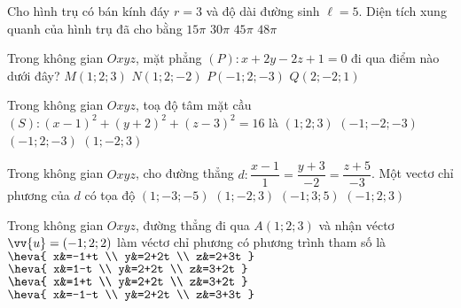 \begin{ex}%
	Cho hình trụ có bán kính đáy $r=3$ và độ dài đường sinh $\ell=5$. Diện tích xung quanh của hình trụ đã cho bằng
	\choice
	{$15\pi$}
	{\True $30\pi$}
	{$45\pi$}
	{$48\pi$}
\end{ex}	

\begin{ex}%
	Trong không gian $Oxyz$, mặt phẳng $(P)\colon x+2y-2z+1=0$ đi qua điểm nào dưới đây?
	\choice
	{\True $M(1;2;3)$}
	{$N(1;2;-2)$}
	{$P(-1;2;-3)$}
	{$Q(2;-2;1)$}
\end{ex}	

\begin{ex}%
	Trong không gian $Oxyz$, toạ độ tâm mặt cầu $(S)\colon (x-1)^2+(y+2)^2+(z-3)^2=16$ là
	\choice
	{$(1;2;3)$}
	{$(-1;-2;-3)$}
	{$(-1;2;-3)$}
	{\True $(1;-2;3)$}
\end{ex}

\begin{ex}%
	Trong không gian $Oxyz$, cho đường thẳng $d\colon\dfrac{x-1}{1}=\dfrac{y+3}{-2}=\dfrac{z+5}{-3}$. Một vectơ chỉ phương của $d$ có tọa độ
	\choice
	{$(1;-3;-5)$}
	{$(1;-2;3)$}
	{$(-1;3;5)$}
	{\True $(-1;2;3)$}
\end{ex}

\begin{ex}%
	Trong không gian $Oxyz$, đường thẳng đi qua $A(1;2;3)$ và nhận véctơ $\vv{u}=(-1;2;2)$ làm véctơ chỉ phương có phương trình tham số là
	\choice
	{$\heva{
			x&=-1+t
			\\
			y&=2+2t
			\\
			z&=2+3t
		}$}
	{\True $\heva{
			x&=1-t
			\\
			y&=2+2t
			\\
			z&=3+2t
		}$}
	{$\heva{
			x&=1+t
			\\
			y&=2+2t
			\\
			z&=3+2t
		}$}
	{$\heva{
			x&=-1-t
			\\
			y&=2+2t
			\\
			z&=3+3t
		}$}
\end{ex}

